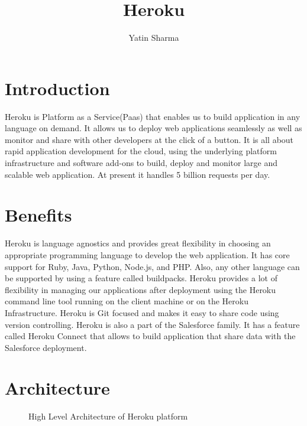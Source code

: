 \documentclass[9pt,twocolumn,twoside]{../../styles/osajnl}
\title{Heroku}
\author[1,*, +]{Yatin Sharma}
\affil[1]{School of Informatics and Computing, Bloomington, IN 47408, U.S.A.}
\affil[*]{Corresponding authors: yatins@indiana.edu}
\affil[+]{HID - S17-IR-2034}
\begin{document}
\maketitle

\section{Introduction}
	Heroku\cite{Heroku} is Platform as a Service(Paas)\cite{PaaS} that enables us to
	build application in any language on demand. It allows us to deploy web
	applications seamlessly as well as monitor and share with other developers at
	the click of a button. It is all about rapid application development for the
	cloud, using the underlying platform infrastructure and software add-ons to
	build, deploy and monitor large and scalable web application. At present it
	handles 5 billion requests per day.
	
\section{Benefits}
	Heroku is language agnostics and provides great flexibility in choosing an
	appropriate programming language to develop the web application. It has core
	support for Ruby, Java, Python, Node.js, and PHP. Also, any other language can
	be supported by using a feature called buildpacks. Heroku provides a lot of
	flexibility in managing our applications after deployment using the Heroku
	command line tool running on the client machine or on the Heroku Infrastructure.
	Heroku is  Git\cite{Git} focused and makes it easy to share code using version
	controlling. Heroku is also a part of the Salesforce family. It has a feature
	called Heroku Connect that allows to build application that share data with the
	Salesforce deployment.

\section{Architecture}
	\begin{figure}[htbp]
		\centering
		\caption{High Level Architecture of Heroku platform}
		\label{fig:Herokul-arch}
	\end{figure}
	
\end{document}
